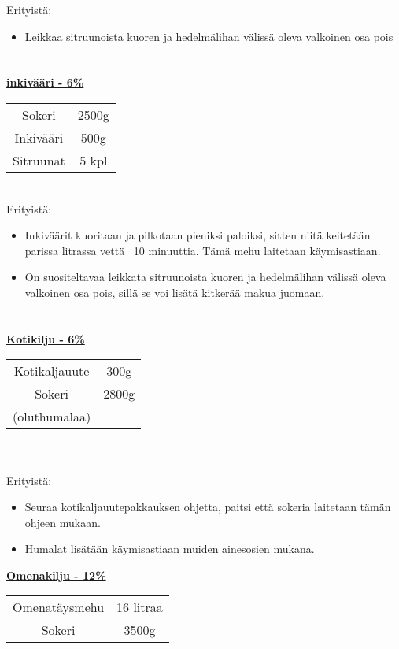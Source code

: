 \documentclass[20pt, a4]{article}
\begin{document}
{    Erityistä:
    \begin{itemize}
        \item Leikkaa sitruunoista kuoren ja hedelmälihan välissä oleva valkoinen osa pois
    \end{itemize}

    \pagebreak
    \section{}


    \underline{\textbf{inkivääri - 6\%}}

    \begin{tabular}{ cc } 
    Sokeri & 2500g\\
    Inkivääri & 500g\\
    Sitruunat & 5 kpl\\

    \end{tabular}
    \\

    Erityistä:
    \begin{itemize}
        \item Inkiväärit kuoritaan ja pilkotaan pieniksi paloiksi, sitten niitä keitetään parissa litrassa vettä ~10 minuuttia. Tämä mehu laitetaan käymisastiaan. 
        \item On suositeltavaa leikkata sitruunoista kuoren ja hedelmälihan välissä oleva valkoinen osa pois, sillä se voi lisätä kitkerää makua juomaan.
    \end{itemize}
    \pagebreak
    \section{}
    \underline{\textbf{Kotikilju - 6\%}}


    \begin{tabular}{ cc } 
        Kotikaljauute & 300g\\
        Sokeri & 2800g\\
        (oluthumalaa)&
    \end{tabular}
    \\
    \\
    Erityistä:
    \begin{itemize}
        \item Seuraa kotikaljauutepakkauksen ohjetta, paitsi että sokeria laitetaan tämän ohjeen mukaan. 
        \item Humalat lisätään käymisastiaan muiden ainesosien mukana.
    \end{itemize}

    \underline{\textbf{Omenakilju - 12\%}}


    \begin{tabular}{ cc } 
        Omenatäysmehu & 16 litraa\\
        Sokeri & 3500g\\
    \end{tabular}
    \\



}
\end{document}
